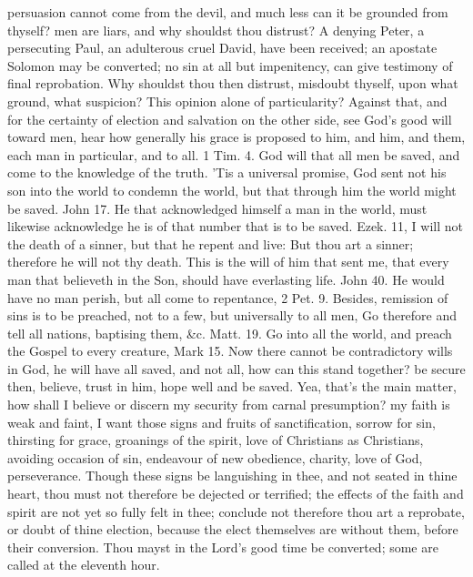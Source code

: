 {persuasion cannot come from the devil, and much less can it be grounded
from thyself? men are liars, and why shouldst thou distrust? A denying
Peter, a persecuting Paul, an adulterous cruel David, have been
received; an apostate Solomon may be converted; no sin at all but
impenitency, can give testimony of final reprobation. Why shouldst thou
then distrust, misdoubt thyself, upon what ground, what suspicion? This
opinion alone of particularity? Against that, and for the certainty of
election and salvation on the other side, see God's good will toward
men, hear how generally his grace is proposed to him, and him, and
them, each man in particular, and to all. 1 Tim.  4. God will that
all men be saved, and come to the knowledge of the truth. 'Tis a
universal promise, God sent not his son into the world to condemn the
world, but that through him the world might be saved. John  17. He
that acknowledged himself a man in the world, must likewise acknowledge
he is of that number that is to be saved. Ezek.  11, I will not
the death of a sinner, but that he repent and live: But thou art a
sinner; therefore he will not thy death. This is the will of him that
sent me, that every man that believeth in the Son, should have
everlasting life. John  40. He would have no man perish, but all
come to repentance, 2 Pet.  9. Besides, remission of sins is to be
preached, not to a few, but universally to all men, Go therefore and
tell all nations, baptising them, \&c. Matt.  19. Go into all the
world, and preach the Gospel to every creature, Mark  15. Now there
cannot be contradictory wills in God, he will have all saved, and not
all, how can this stand together? be secure then, believe, trust in
him, hope well and be saved. Yea, that's the main matter, how shall I
believe or discern my security from carnal presumption? my faith is
weak and faint, I want those signs and fruits of sanctification,
sorrow for sin, thirsting for grace, groanings of the spirit,
love of Christians as Christians, avoiding occasion of sin, endeavour
of new obedience, charity, love of God, perseverance. Though these
signs be languishing in thee, and not seated in thine heart, thou must
not therefore be dejected or terrified; the effects of the faith and
spirit are not yet so fully felt in thee; conclude not therefore thou
art a reprobate, or doubt of thine election, because the elect
themselves are without them, before their conversion. Thou mayst in the
Lord's good time be converted; some are called at the eleventh hour.

}
